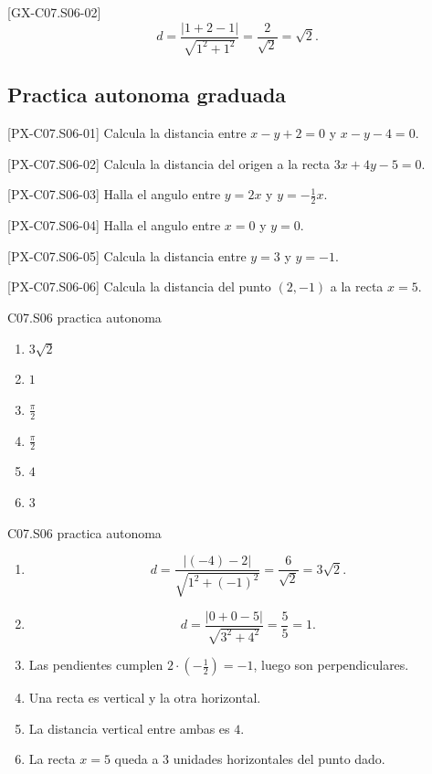 \begin{fullsolution}{[GX-C07.S06-02]}
\[
d=\frac{|1+2-1|}{\sqrt{1^2+1^2}}=\frac{2}{\sqrt{2}}=\sqrt{2}.
\]
\end{fullsolution}

\subsection*{Practica autonoma graduada}
\begin{exercise}{[PX-C07.S06-01] Calcula la distancia entre \(x-y+2=0\) y \(x-y-4=0\).}
\end{exercise}
\begin{exercise}{[PX-C07.S06-02] Calcula la distancia del origen a la recta \(3x+4y-5=0\).}
\end{exercise}
\begin{exercise}{[PX-C07.S06-03] Halla el angulo entre \(y=2x\) y \(y=-\frac{1}{2}x\).}
\end{exercise}
\begin{exercise}{[PX-C07.S06-04] Halla el angulo entre \(x=0\) y \(y=0\).}
\end{exercise}
\begin{exercise}{[PX-C07.S06-05] Calcula la distancia entre \(y=3\) y \(y=-1\).}
\end{exercise}
\begin{exercise}{[PX-C07.S06-06] Calcula la distancia del punto \((2,-1)\) a la recta \(x=5\).}
\end{exercise}

\begin{shortanswer}{C07.S06 practica autonoma}
\begin{enumerate}[label=\textbf{PX-C07.S06-\arabic*:}, leftmargin=*]
  \item \(3\sqrt{2}\)
  \item \(1\)
  \item \(\frac{\pi}{2}\)
  \item \(\frac{\pi}{2}\)
  \item \(4\)
  \item \(3\)
\end{enumerate}
\end{shortanswer}

\begin{fullsolution}{C07.S06 practica autonoma}
\begin{enumerate}[label=\textbf{PX-C07.S06-\arabic*:}, leftmargin=*]
  \item
  \[
  d=\frac{|(-4)-2|}{\sqrt{1^2+(-1)^2}}=\frac{6}{\sqrt{2}}=3\sqrt{2}.
  \]
  \item
  \[
  d=\frac{|0+0-5|}{\sqrt{3^2+4^2}}=\frac{5}{5}=1.
  \]
  \item Las pendientes cumplen \(2\cdot \left(-\frac{1}{2}\right)=-1\), luego son perpendiculares.
  \item Una recta es vertical y la otra horizontal.
  \item La distancia vertical entre ambas es \(4\).
  \item La recta \(x=5\) queda a \(3\) unidades horizontales del punto dado.
\end{enumerate}
\end{fullsolution}

